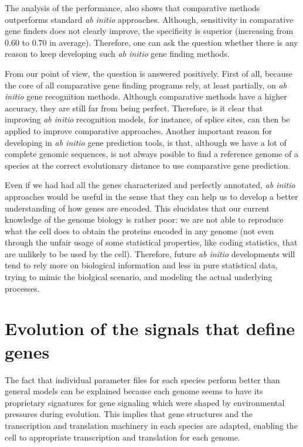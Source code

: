 The analysis of the performance, also shows that comparative methods
outperforms standard \textit{ab initio} approaches. Although,
sensitivity in comparative gene finders does not clearly improve, the
specificity is superior (increasing from 0.60 to 0.70 in average).
Therefore, one can ask the question whether there is any reason to
keep developing such \textit{ab initio} gene finding methods.

From our point of view, the question is answered positively. First of
all, because the core of all comparative gene finding programs rely,
at least partially, on \textit{ab initio} gene recognition
methods. Although comparative methods have a higher accuracy, they are
still far from being perfect. Therefore, is it clear that improving
\textit{ab initio} recognition models, for instance, of splice sites,
can then be applied to improve comparative approaches. Another
important reason for developing in \textit{ab initio} gene prediction
tools, is that, although we have a lot of complete genomic sequences,
is not always posible to find a reference genome of a species at the
correct evolutionary distance to use comparative gene prediction.

Even if we had had all the genes characterized and perfectly
annotated, \textit{ab initio} approaches would be useful in the sense
that they can help us to develop a better understanding of how genes
are encoded. This elucidates that our current knowledge of the
genome biology is rather poor: we are not able to reproduce what
the cell does to obtain the proteins encoded in any genome (not even
through the unfair usage of some statistical properties, like coding
statistics, that are unlikely to be used by the cell). Therefore,
future \textit{ab initio} developments will tend to rely more on
biological information and less in pure statistical data, trying to
mimic the biolgical scenario, and modeling the actual underlying
processes.


\section{Evolution of the signals that define genes}

The fact that individual parameter files for each species perform
better than general models can be explained because each genome seems
to have its proprietary signatures for gene signaling which were
shaped by environmental pressures during evolution. This implies that
gene structures and the transcription and translation machinery in
each species are adapted, enabling the cell to appropriate
transcription and translation for each genome.

